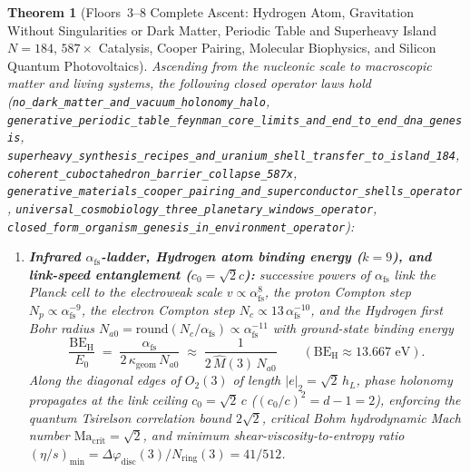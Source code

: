 \documentclass[11pt,a4paper]{article}
\theoremstyle{plain}
\newtheorem{theorem}{Theorem}[section]
\theoremstyle{definition}
\begin{document}
\begin{theorem}[Floors~3--8 Complete Ascent: Hydrogen Atom, Gravitation Without Singularities or Dark Matter, Periodic Table and Superheavy Island $N=184$, $587\times$ Catalysis, Cooper Pairing, Molecular Biophysics, and Silicon Quantum Photovoltaics]
\label{thm:floors-3-to-8-complete-ascent}
Ascending from the nucleonic scale to macroscopic matter and living systems, the following closed operator laws hold (\texttt{no\_dark\_matter\_and\_vacuum\_holonomy\_halo}, \texttt{generative\_periodic\_table\_feynman\_core\_limits\_and\_end\_to\_end\_dna\_genesis}, \texttt{superheavy\_synthesis\_recipes\_and\_uranium\_shell\_transfer\_to\_island\_184}, \texttt{coherent\_cuboctahedron\_barrier\_collapse\_587x}, \texttt{generative\_materials\_cooper\_pairing\_and\_superconductor\_shells\_operator}, \texttt{universal\_cosmobiology\_three\_planetary\_windows\_operator}, \texttt{closed\_form\_organism\_genesis\_in\_environment\_operator}):
\begin{enumerate}[label=\textbf{(\arabic*)},leftmargin=*]
\item \textbf{Infrared $\alpha_{\mathrm{fs}}$-ladder, Hydrogen atom binding energy ($k = 9$), and link-speed entanglement ($c_0 = \sqrt{2}c$):}
  successive powers of $\alpha_{\mathrm{fs}}$ link the Planck cell to the electroweak scale $v \propto \alpha_{\mathrm{fs}}^8$, the proton Compton step $N_p \propto \alpha_{\mathrm{fs}}^{-9}$, the electron Compton step $N_c \propto 13\,\alpha_{\mathrm{fs}}^{-10}$, and the Hydrogen first Bohr radius $N_{a0} = \mathrm{round}(N_c / \alpha_{\mathrm{fs}}) \propto \alpha_{\mathrm{fs}}^{-11}$ with ground-state binding energy
  \begin{equation}
    \label{eq:hydrogen-binding-energy}
    \frac{\mathrm{BE}_{\mathrm{H}}}{E_0} \;=\; \frac{\alpha_{\mathrm{fs}}}{2\,\kappa_{\mathrm{geom}}\,N_{a0}} \;\approx\; \frac{1}{2\,\widehat{M}(3)\,N_{a0}} \qquad (\mathrm{BE}_{\mathrm{H}} \approx 13.667\text{ eV}).
  \end{equation}
  Along the diagonal edges of $O_2(3)$ of length $|e|_2 = \sqrt{2}\,h_L$, phase holonomy propagates at the link ceiling $c_0 = \sqrt{2}\,c$ ($(c_0/c)^2 = d - 1 = 2$), enforcing the quantum Tsirelson correlation bound $2\sqrt{2}$, critical Bohm hydrodynamic Mach number $\mathrm{Ma}_{\mathrm{crit}} = \sqrt{2}$, and minimum shear-viscosity-to-entropy ratio $(\eta/s)_{\min} = \Delta\varphi_{\mathrm{disc}}(3)/N_{\mathrm{ring}}(3) = 41/512$.


\end{enumerate}
\end{theorem}
\end{document}
